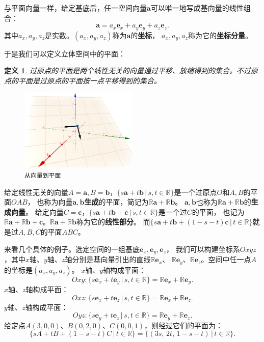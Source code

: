 \documentclass[12pt,UTF8]{ctexbook}
\newtheorem{df}{定义}[section]
\begin{document}
与平面向量一样，给定基底后，任一空间向量$\mathbf{a}$可以唯一地写成基向量的线性组合：
$$ \mathbf{a} = a_x\mathbf{e}_x + a_y\mathbf{e}_y + a_z\mathbf{e}_z.$$
其中$a_x, a_y, a_z$是实数。$(a_x, a_y, a_z)$称为$\mathbf{a}$的\textbf{坐标}，
$a_x, a_y, a_z$称为它的\textbf{坐标分量}。

于是我们可以定义立体空间中的平面：
\begin{df}
    过原点的平面是两个线性无关的向量通过平移、放缩得到的集合。不过原点的平面是过原点的平面按一点平移得到的集合。
\end{df}

\begin{figure}[h] 
    \centering
    \includegraphics[width=0.5\textwidth]{空间基底1.png}
    \caption*{\texttt{从向量到平面}}
\end{figure}

给定线性无关的向量$A = \mathbf{a}, B = \mathbf{b}$，$ \{s\mathbf{a} + t\mathbf{b} \, | \, s, t\in\mathbb{R}\}$是一个过原点$O$和$A, B$的平面$OAB$，
也称为向量$\mathbf{a},\mathbf{b}$\textbf{生成}的平面，简记为$\mathbb{R}\mathbf{a}+\mathbb{R}\mathbf{b}$。
$\mathbf{a},\mathbf{b}$也称为$\mathbb{R}\mathbf{a}+\mathbb{R}\mathbf{b}$的\textbf{生成向量}。
给定向量$C = \mathbf{c}$，$ \{s\mathbf{a}+t\mathbf{b}+\mathbf{c}\, | \, s,t\in\mathbb{R}\}$是一个过$C$的平面，
也记为$\mathbb{R}\mathbf{a}+\mathbb{R}\mathbf{b}+\mathbf{c}$。$\mathbb{R}\mathbf{a}+\mathbb{R}\mathbf{b}$称为它的\textbf{线性部分}。
而$ \{s\mathbf{a}+t\mathbf{b}+(1 - s - t)\mathbf{c} \, | \, t\in\mathbb{R}\}$就是过$A,B,C$的平面$ABC$。

来看几个具体的例子。选定空间的一组基底$\mathbf{e}_x,\mathbf{e}_y,\mathbf{e}_z$，
我们可以构建坐标系$Oxyz$，其中$x$轴、$y$轴、$z$轴分别是基向量引出的直线$\mathbb{R}\mathbf{e}_x$、
$\mathbb{R}\mathbf{e}_y$、$\mathbb{R}\mathbf{e}_z$。空间中任一点$A$的坐标是$(a_x,a_y,a_z)$。
$x$轴、$y$轴构成平面：
$$ Oxy : \{s\mathbf{e}_x+t\mathbf{e}_y\,|\,s,t\in\mathbb{R}\} = \mathbb{R}\mathbf{e}_x + \mathbb{R}\mathbf{e}_y. $$
$x$轴、$z$轴构成平面：
$$ Oxz : \{s\mathbf{e}_x+t\mathbf{e}_z\,|\,s,t\in\mathbb{R}\} = \mathbb{R}\mathbf{e}_x + \mathbb{R}\mathbf{e}_z. $$
$y$轴、$z$轴构成平面：
$$ Oyz : \{s\mathbf{e}_y+t\mathbf{e}_z\,|\,s,t\in\mathbb{R}\} = \mathbb{R}\mathbf{e}_y + \mathbb{R}\mathbf{e}_z. $$
给定点$A(3,0,0)$、$B(0,2,0)$、$C(0,0,1)$，则经过它们的平面为：
$$ \{sA+tB+(1 - s - t)C \, | \, t\in\mathbb{R}\} = \{(3s,\,2t,\,1-s-t) \, | \, t\in\mathbb{R}\}. $$
\end{document}
